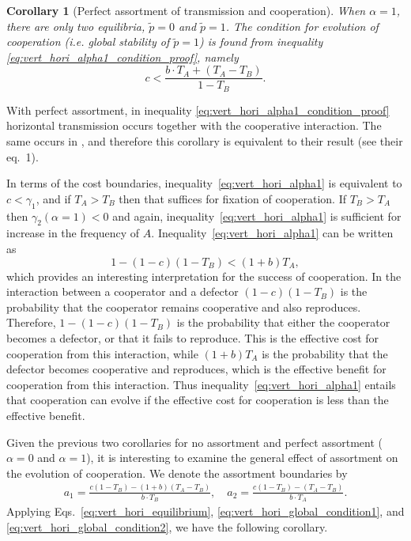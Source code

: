\documentclass[12pt]{extarticle}
\newtheorem{corollary}{Corollary}
\begin{document}
{\begin{corollary}[Perfect assortment of transmission and cooperation]
When $\alpha=1$, there are only two equilibria, $\tilde{p}=0$ and $\tilde{p}=1$.
The condition for evolution of cooperation (i.e. global stability of $\tilde{p}=1$) is found from inequality \ref{eq:vert_hori_alpha1_condition_proof}, namely
\begin{equation}\label{eq:vert_hori_alpha1}
c < \frac{b \cdot T_A + (T_A - T_B)}{1-T_B}.
\end{equation}
\end{corollary}
With perfect assortment, in inequality \ref{eq:vert_hori_alpha1_condition_proof}
 horizontal transmission  occurs together with the cooperative interaction. The same occurs in \citet{lewin2017microbes}, and therefore this corollary is equivalent to their result (see their eq.~1).

In terms of the cost boundaries, inequality~\ref{eq:vert_hori_alpha1} is equivalent to $c<\gamma_1$, and if $T_A>T_B$ then that suffices for fixation of cooperation. If $T_B>T_A$ then $\gamma_2(\alpha=1)<0$ and again, inequality~\ref{eq:vert_hori_alpha1} is sufficient for increase in the frequency of $A$.
Inequality~\ref{eq:vert_hori_alpha1} can be written as
\begin{equation} \label{eq:vert_hori_alpha1_effective}
1 - (1-c)(1-T_B) < (1+b) T_A ,
\end{equation}
which provides an interesting interpretation for the success of cooperation. 
In the interaction between a cooperator and a defector $(1-c)(1-T_B)$ is the probability that the cooperator remains cooperative and also reproduces. 
Therefore, $1 - (1-c)(1-T_B)$ is the probability that either the cooperator becomes a defector, or that it fails to reproduce.
This is the effective cost for cooperation from this interaction, while $(1+b) T_A$ is the probability that the defector becomes cooperative and reproduces, which is the effective benefit for cooperation from this interaction.
Thus inequality~\ref{eq:vert_hori_alpha1} entails that cooperation can evolve if the effective cost for cooperation is less than the effective benefit.

Given the previous two corollaries for no assortment and perfect assortment ($\alpha=0$ and $\alpha=1$), it is interesting to examine the general effect of assortment on the evolution of cooperation.
We denote the assortment boundaries by
\begin{equation}\begin{aligned}\label{eq:boundries_assortative_meeting}
  a_1 = \frac{c(1-T_B)-(1+b)(T_A-T_B)}{b\cdot T_B}, \quad
  a_2 = \frac{c(1-T_B)-(T_A-T_B)}{b\cdot T_A}.
\end{aligned}\end{equation}
Applying Eqs.~\ref{eq:vert_hori_equilibrium}, \ref{eq:vert_hori_global_condition1}, and \ref{eq:vert_hori_global_condition2}, we have the following corollary.
\\

}
\end{document}
